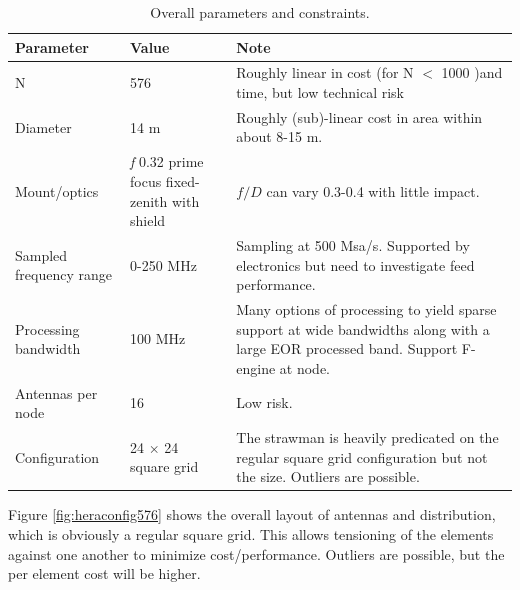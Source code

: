 \documentclass[11pt]{article}
\begin{document}
\begin{table}
\caption{Overall parameters and constraints.}
\label{tab:overall}
\begin{tabular}{|p{3cm}|p{3cm}|p{8cm}|}
\hline
{\bf Parameter} & {\bf Value} & {\bf Note} \\
\hline
N  &  576  & Roughly linear in cost (for N $<$ 1000 )and time, but low technical risk \\ \hline
Diameter & 14 m& Roughly (sub)-linear cost in area within about 8-15 m.  \\ \hline
Mount/optics & {\em f} 0.32 prime focus fixed-zenith with shield & $f/D$ can vary 0.3-0.4 with little impact. \\ \hline
Sampled frequency range & 0-250 MHz &  Sampling at 500 Msa/s.  Supported by electronics but need to investigate feed performance. \\ \hline
Processing bandwidth & 100 MHz & Many options of processing to yield sparse support at wide bandwidths along with a large EOR processed band.  Support F-engine at node. \\ \hline
Antennas per node & 16	 & Low risk. \\ \hline
Configuration	& 24 $\times$ 24 square grid & The strawman is heavily predicated on the regular square grid configuration but not the size.  Outliers are possible. \\ \hline
\end{tabular}
\end{table}

Figure \ref{fig:heraconfig576} shows the overall layout of antennas and distribution, which is obviously a regular square grid.  This allows tensioning of the elements against one another to minimize cost/performance.  Outliers are possible, but the per element cost will be higher.
\end{document}
